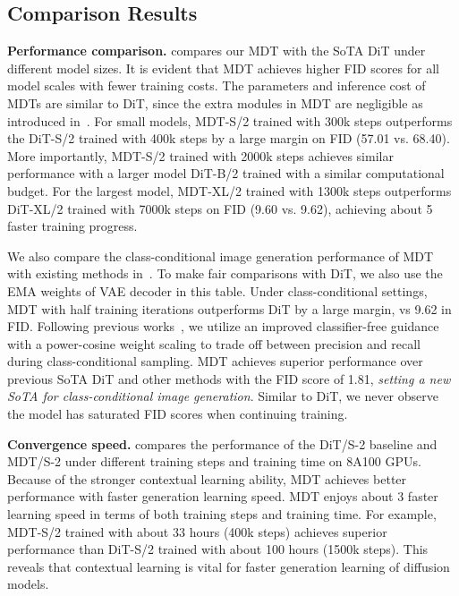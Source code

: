 \documentclass[final]{cvpr}
\newcommand{\myPara}[1]{\vspace{.08in} \noindent\textbf{#1}}
\begin{document}
\subsection{Comparison Results}

\myPara{Performance comparison.}
  compares our MDT with the SoTA DiT  
under different model sizes. 
It is evident that 
MDT achieves higher FID scores for all model scales with fewer training costs.
The parameters and inference cost of MDTs are similar to DiT, since 
  the extra modules in MDT are negligible as introduced in~. 
For small models, MDT-S/2 trained with 300k steps outperforms the DiT-S/2
trained with 400k steps by a large margin on FID (57.01 vs. 68.40). More importantly,
MDT-S/2 trained with 2000k steps achieves similar performance with a larger model DiT-B/2 trained with a similar computational budget.
For the largest model,
MDT-XL/2 trained with 1300k steps outperforms
DiT-XL/2 trained with 7000k steps on FID (9.60 vs. 9.62),
achieving about 5 faster training progress.

We also compare the class-conditional image generation performance of MDT with existing methods
in~. 
To make fair comparisons with DiT,
we also use the EMA weights of VAE decoder in this table.
Under class-conditional settings, MDT with half training iterations outperforms DiT by a large margin,
 vs 9.62 in FID.
Following previous works~\cite{rombach2022high,dhariwal2021diffusion,peebles2022scalable,bao2022all},
we utilize an improved classifier-free guidance~\cite{ho2022classifier}
with a power-cosine weight scaling
to trade off between precision and recall
during class-conditional sampling.
MDT achieves superior performance over  
previous SoTA DiT and other methods with the FID score of 1.81, \emph{setting a new SoTA for class-conditional image generation}.
Similar to DiT,
we never observe the model has saturated FID scores when continuing training.

\myPara{Convergence speed.}
 compares the performance of the DiT/S-2 baseline and MDT/S-2 
under different training steps and training time
  on  8A100 GPUs.
Because of the stronger contextual learning ability,
MDT achieves better performance with faster generation learning speed.
MDT enjoys about 3 faster learning speed in terms of both training steps and training time. 
For example,  MDT-S/2 trained with about 33 hours (400k steps) achieves superior  performance 
than DiT-S/2 trained with 
about 100 hours (1500k steps). 
This reveals that contextual learning is vital for
faster generation learning of diffusion models.
\end{document}
